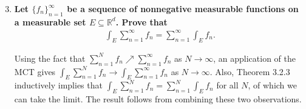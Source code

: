 \documentclass[a4paper,12pt]{article}
\begin{document}
\begin{enumerate}
    \setcounter{enumi}{2}
    \item
        \boldmath\textbf{Let $\{f_n\}_{n = 1}^\infty$ be a sequence of nonnegative measurable functions on a measurable set $E \subseteq \mathbb{R}^d$. Prove that
        \begin{align*}
            \int_E \sum_{n = 1}^\infty f_n = \sum_{n = 1}^\infty \int_E f_n.
        \end{align*}
        }\unboldmath \par
        \sloppy
        Using the fact that $\sum_{n = 1}^N f_n \nearrow \sum_{n = 1}^\infty f_n$ as $N \to \infty$, an application of the MCT gives $\int_E \sum_{n = 1}^N f_n \to \int_E \sum_{n = 1}^\infty f_n$ as $N \to \infty$. Also, Theorem 3.2.3 inductively implies that $\int_E \sum_{n = 1}^N f_n = \sum_{n = 1}^N \int_E f_n$ for all $N$, of which we can take the limit. The result follows from combining these two observations.


\end{enumerate}
\end{document}
